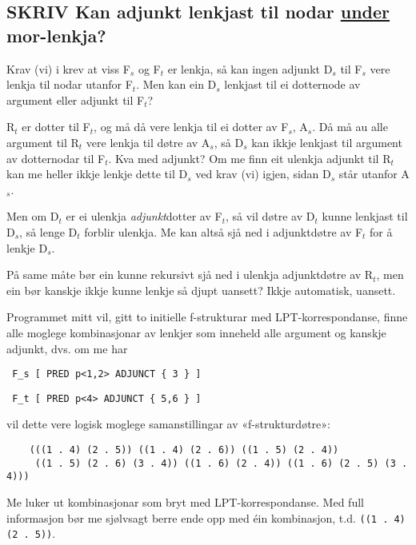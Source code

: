 \documentclass[11pt,a4paper,oneside,draft]{book}
\begin{document}
\subsection{\textbf{SKRIV} Kan adjunkt lenkjast til nodar \underline{under} mor-lenkja?}
\label{sec-3.6.4}

\label{SEC:merge-daughters}

Krav (vi) i \citet[s.~75]{dyvik2009lmp} krev at viss F$_s$ og F$_t$ er
lenkja, så kan ingen adjunkt D$_s$ til F$_s$ vere lenkja til nodar utanfor
F$_t$. Men kan ein D$_s$ lenkjast til ei dotternode av argument eller
adjunkt til F$_t$?

R$_t$ er dotter til F$_t$, og må då vere lenkja til ei dotter av F$_s$,
A$_s$. Då må au alle argument til R$_t$ vere lenkja til døtre av A$_s$, så
D$_s$ kan ikkje lenkjast til argument av dotternodar til F$_t$. Kva med
adjunkt? Om me finn eit ulenkja adjunkt til R$_t$ kan me heller ikkje
lenkje dette til D$_s$ ved krav (vi) igjen, sidan D$_s$ står utanfor
A$_s$.

Men om D$_t$ er ei ulenkja \emph{adjunkt}dotter av F$_t$, så vil døtre av
D$_t$ kunne lenkjast til D$_s$, så lenge D$_t$ forblir ulenkja. Me kan altså
sjå ned i adjunktdøtre av F$_t$ for å lenkje D$_s$. 

På same måte bør ein kunne rekursivt sjå ned i ulenkja adjunktdøtre av
R$_t$, men ein bør kanskje ikkje kunne lenkje så djupt uansett? Ikkje
automatisk, uansett.



Programmet mitt vil, gitt to initielle f-strukturar med
LPT-korrespondanse, finne alle moglege kombinasjonar av lenkjer som
inneheld alle argument og kanskje adjunkt, dvs. om me har

\begin{verbatim}
 F_s [ PRED p<1,2> ADJUNCT { 3 } ]
\end{verbatim}


\begin{verbatim}
 F_t [ PRED p<4> ADJUNCT { 5,6 } ]
\end{verbatim}


vil dette vere logisk moglege samanstillingar av «f-strukturdøtre»:

\begin{verbatim}
    (((1 . 4) (2 . 5)) ((1 . 4) (2 . 6)) ((1 . 5) (2 . 4))
     ((1 . 5) (2 . 6) (3 . 4)) ((1 . 6) (2 . 4)) ((1 . 6) (2 . 5) (3 . 4)))
\end{verbatim}


Me luker ut kombinasjonar som bryt med LPT-korrespondanse. Med full
informasjon bør me sjølvsagt berre ende opp med éin kombinasjon,
t.d. \texttt{((1 . 4) (2 . 5))}.
\end{document}
